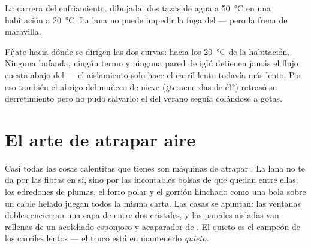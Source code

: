 \begin{omfigure}

{\small La carrera del enfriamiento, dibujada: dos tazas de agua a
\qty{50}{\celsius} en una habitación a \qty{20}{\celsius}. La lana no
puede impedir la fuga del  --- pero la frena de maravilla.}
\end{omfigure}

\begin{remark}\label{rem:g5:heat-and-insulation:onlyslows}
Fíjate hacia dónde se dirigen las dos curvas: hacia los
\qty{20}{\celsius} de la habitación. Ninguna bufanda, ningún termo y
ninguna pared de iglú detienen jamás el flujo cuesta abajo del
 --- el aislamiento solo hace el carril lento todavía más
lento. Por eso también el abrigo del muñeco de nieve (¿te acuerdas de
él?) retrasó su derretimiento pero no pudo salvarlo: el  del
verano seguía colándose a gotas.
\end{remark}

\section{El arte de atrapar aire}

\begin{example}\label{ex:g5:heat-and-insulation:air}
Casi todas las cosas calentitas que tienes son máquinas de atrapar
. La lana no te da  por las fibras en sí, sino por las
incontables bolsas de  que quedan entre ellas; los edredones de
plumas, el forro polar y el gorrión hinchado como una bola sobre un
cable helado juegan todos la misma carta. Las casas se apuntan:
las ventanas dobles encierran una capa de  entre dos cristales, y
las paredes aisladas van rellenas de un acolchado esponjoso y
acaparador de . El  quieto es el campeón de los carriles
lentos --- el truco está en mantenerlo \emph{quieto}.
\end{example}

